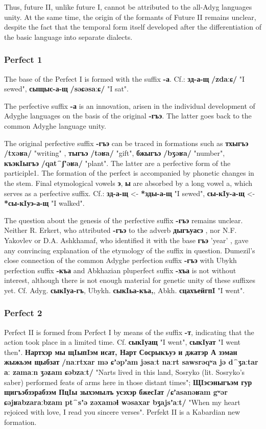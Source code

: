 \documentclass[a4paper,12pt]{book}
\newcommand{\1}[1]{\textbf{\emph{#1}}} %
\newcommand{\2}[1]{\textbf{[#1]}} %
\newcommand{\3}[1]{\fontsize{11pt}{0cm}\textbf{\emph{#1}}} %
\newcommand{\4}[1]{\fontsize{10pt}{0cm}\emph{#1}}	%
\newcommand{\5}[1]{\textbf{/#1/}} %
\newcommand{\6}[1]{\textbf{[#1]}} %
\newcommand{\7}[1]{\fontsize{12pt}{0cm}\emph{#1}} %
\newcommand{\8}[1]{\fontsize{12pt}{0cm}`#1'} %
\newcommand{\9}[1]{\fontsize{12pt}{0cm}(lit. `#1')} %
\newcommand{\glossphonemics}[1]{\textbf{/#1/}} %
\begin{document}
Thus, future II, unlike future I, cannot be attributed to the all-Adyg languages unity. At the same time, the origin of the formants of Future II remains unclear, despite the fact that the temporal form itself developed after the differentiation of the basic language into separate dialects.
\subsubsection{Perfect 1}
The base of the Perfect I is formed with the suffix \textbf{-а}. Cf.: \textbf{зд-а-щ} \glossphonemics{zdaːɕ} "I sewed", \textbf{сыщыс-а-щ} \glossphonemics{səɕəsaːɕ} "I sat".

The perfective suffix \textbf{-а} is an innovation, arisen in the individual development of Adyghe languages on the basis of the original \textbf{-гъэ}. The latter goes back to the common Adyghe language unity.

The original perfective suffix \textbf{-гъэ} can be traced in formations such as \textbf{тхыгъэ} \glossphonemics{txəʁa} "writing" , \textbf{тыгъэ} \glossphonemics{təʁa} "gift", \textbf{бжыгъэ} \glossphonemics{bʒəʁa} "number", \textbf{къэкIыгъэ} \glossphonemics{qat⁀ʃʼəʁa} "plant". The latter are a perfective form of the participle1. The formation of the perfect is accompanied by phonetic changes in the stem. Final etymological vowels \textbf{э}, \textbf{ы} are absorbed by a long vowel a, which serves as a perfective suffix. Cf.: \textbf{зд-а-щ} <- \textbf{*зды-а-щ} "I sewed", \textbf{сы-кIу-а-щ} <- \textbf{*сы-кIуэ-а-щ} "I walked".

The question about the genesis of the perfective suffix \textbf{-гъэ} remains unclear. Neither R. Erkert, who attributed \textbf{-гъэ} to the adverb \textbf{дыгъуасэ} , nor N.F. Yakovlev or D.A. Ashkhamaf, who identified it with the base \textbf{гъэ} 'year' , gave any convincing explanation of the etymology of the suffix in question. Dumezil's close connection of the common Adyghe perfection suffix \textbf{-гъэ} with Ubykh perfection suffix \textbf{-къа} and Abkhazian pluperfect suffix \textbf{-хъа} is not without interest, although there is not enough material for genetic unity of these suffixes yet. Cf. Adyg. \textbf{сыкIуа-гъ}, Ubykh. \textbf{сыкIьа-къа,}, Abkh. \textbf{сцахъейгпI} "I went".
\subsubsection{Perfect 2}
Perfect II is formed from Perfect I by means of the suffix \textbf{-т}, indicating that the action took place in a limited time. Cf. \textbf{сыкIуащ} "I went", \textbf{сыкIуат} "I went then".
\textbf{Нартхэр мы щIыпIэм исат, Нарт Сосрыкъуэ и джатэр А зэман жыжьэм щыбзат} \glossphonemics{naːrtxar mə ɕʼəpʼam jəsaːt naːrt sawsrəqʷa jə d⁀ʒaːtar aː zamaːn ʒəʑam ɕəbzaːt} "Narts lived in this land, Sosryko (lit. Sosryko's saber) performed feats of arms here in those distant times"; \textbf{ЩIэсэныгъэм гур щигъэбзэрабзэм ПцIы зыхэмылъ усэхэр бжесIат} \glossphonemics{ɕʼasanəʁam gʷər ɕəjʁabzaraːbzam pt⁀sʼə zəxaməɬ wəsaxar bʒajsʼaːt} "When my heart rejoiced with love, I read you sincere verses".
Perfekt II is a Kabardian new formation.
\end{document}
